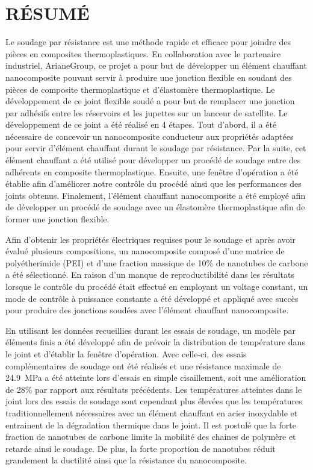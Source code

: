 %
\chapter*{RÉSUMÉ}\thispagestyle{headings}

Le soudage par résistance est une méthode rapide et efficace pour joindre des pièces en composites thermoplastiques. 
En collaboration avec le partenaire industriel, ArianeGroup, ce projet a pour but de développer un élément chauffant nanocomposite pouvant servir à produire une jonction flexible en soudant des pièces de composite thermoplastique et d'élastomère thermoplastique.
Le développement de ce joint flexible soudé a pour but de remplacer une jonction par adhésifs entre les réservoirs et les jupettes sur un lanceur de satellite. 
Le développement de ce joint a été réalisé en 4 étapes. 
Tout d'abord, il a été nécessaire de concevoir un nanocomposite conducteur aux propriétés adaptées pour servir d'élément chauffant durant le soudage par résistance. 
Par la suite, cet élément chauffant a été utilisé pour développer un procédé de soudage entre des adhérents en composite thermoplastique. 
Ensuite, une fenêtre d'opération a été établie afin d'améliorer notre contrôle du procédé ainsi que les performances des joints obtenus. 
Finalement, l'élément chauffant nanocomposite a été employé afin de développer un procédé de soudage avec un élastomère thermoplastique afin de former une jonction flexible. 

Afin d'obtenir les propriétés électriques requises pour le soudage et après avoir évalué plusieurs compositions, un nanocomposite composé d'une matrice de polyétherimide (PEI) et d'une fraction massique de 10\% de nanotubes de carbone a été sélectionné. 
En raison d'un manque de reproductibilité dans les résultats lorsque le contrôle du procédé était effectué en employant un voltage constant, un mode de contrôle à puissance constante a été développé et appliqué avec succès pour produire des jonctions soudées avec l'élément chauffant nanocomposite.  

En utilisant les données recueillies durant les essais de soudage, un modèle par éléments finis a été développé afin de prévoir la distribution de température dans le joint et d'établir la fenêtre d'opération. 
Avec celle-ci, des essais complémentaires de soudage ont été réalisés et une résistance maximale de \SI[locale=FR]{24.9}{\mega\pascal} a été atteinte lors d'essais en simple cisaillement, soit une amélioration de 28\% par rapport aux résultats précédents. 
Les températures atteintes dans le joint lors des essais de soudage sont cependant plus élevées que les températures traditionnellement nécessaires avec un élément chauffant en acier inoxydable et entrainent de la dégradation thermique dans le joint. 
Il est postulé que la forte fraction de nanotubes de carbone limite la mobilité des chaines de polymère et retarde ainsi le soudage. 
De plus, la forte proportion de nanotubes réduit grandement la ductilité ainsi que la résistance du nanocomposite. 

